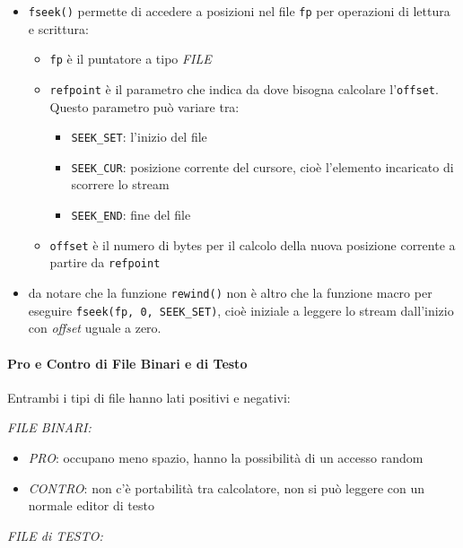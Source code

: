\documentclass[
]{article}
\begin{document}
\begin{itemize}
\item
  \texttt{fseek()} permette di accedere a posizioni nel file \texttt{fp}
  per operazioni di lettura e scrittura:

  \begin{itemize}
  \item
    \texttt{fp} è il puntatore a tipo \emph{FILE}
  \item
    \texttt{refpoint} è il parametro che indica da dove bisogna
    calcolare l'\texttt{offset}. Questo parametro può variare tra:

    \begin{itemize}
    \item
      \texttt{SEEK\_SET}: l'inizio del file
    \item
      \texttt{SEEK\_CUR}: posizione corrente del cursore, cioè
      l'elemento incaricato di scorrere lo stream
    \item
      \texttt{SEEK\_END}: fine del file
    \end{itemize}
  \item
    \texttt{offset} è il numero di bytes per il calcolo della nuova
    posizione corrente a partire da \texttt{refpoint}
  \end{itemize}
\item
  da notare che la funzione \texttt{rewind()} non è altro che la
  funzione macro per eseguire \texttt{fseek(fp,\ 0,\ SEEK\_SET)}, cioè
  iniziale a leggere lo stream dall'inizio con \emph{offset} uguale a
  zero.
\end{itemize}

\hypertarget{header-n1066}{%
\paragraph{Pro e Contro di File Binari e di Testo}\label{header-n1066}}

Entrambi i tipi di file hanno lati positivi e negativi:

\emph{FILE BINARI:}

\begin{itemize}
\item
  \emph{PRO}: occupano meno spazio, hanno la possibilità di un accesso
  random
\item
  \emph{CONTRO}: non c'è portabilità tra calcolatore, non si può leggere
  con un normale editor di testo
\end{itemize}

\emph{FILE di TESTO:}
\end{document}
